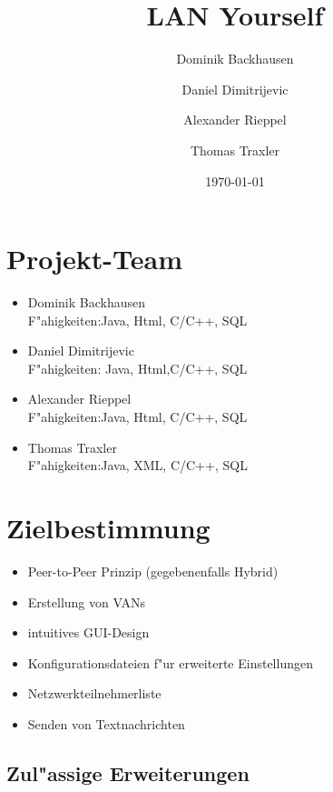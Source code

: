 \documentclass[a4paper,12pt]{scrreprt}
\begin{document}
\author{Dominik Backhausen \and Daniel Dimitrijevic \and Alexander Rieppel \and Thomas Traxler}
\subject{Pflichtenheft}
\title{LAN Yourself}
\date{\today}
\maketitle
\tableofcontents

\chapter{Projekt-Team}
	\begin{itemize}
	\item Dominik Backhausen\\
	F"ahigkeiten:Java, Html, C/C++, SQL
	\item Daniel Dimitrijevic\\
	F"ahigkeiten: Java, Html,C/C++, SQL
	\item Alexander Rieppel\\
		F"ahigkeiten:Java, Html, C/C++, SQL    
	\item Thomas Traxler\\
	F"ahigkeiten:Java, XML, C/C++, SQL
	\end{itemize}
	
	
\chapter{Zielbestimmung}
	\begin{itemize}
	\item Peer-to-Peer Prinzip (gegebenenfalls Hybrid)
	\item Erstellung von VANs
	\item intuitives GUI-Design
	\item Konfigurationsdateien f"ur erweiterte Einstellungen
	\item Netzwerkteilnehmerliste
	\item Senden von Textnachrichten
	\end{itemize}
	
	\section{Zul"assige Erweiterungen}
	
\end{document}
